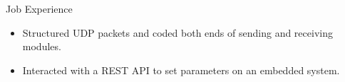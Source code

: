 \begin{rubric}{Job Experience}
\begin{itemize}[leftmargin=*, rightmargin=1cm]
	\item Structured UDP packets and coded both ends of sending and receiving modules.
	\item Interacted with a REST API to set parameters on an embedded system.
\end{itemize}
\begin{comment}
%
%
\entry*[] \textbf{Creative Edge LLC} \hfill 08.2017 -- 09.2018 \newline
\textit{Software Engineer} \hfill Denver, USA \newline
\vspace{\CVItemizeHeaderSpacing} \begin{itemize}[leftmargin=*, rightmargin=1cm]
	\setlength{\itemsep}{\CVItemizeSpacing}
	\item Developed applications for cryptocurrency mining in both Windows and Linux.  
	\item Wrote software managing OS drivers, system configurations, and 3rd party tools.
\end{itemize}
\end{comment}
\end{rubric}
